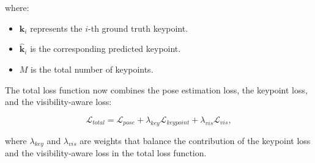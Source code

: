 \noindent where:

\begin{itemize}
    \item $\mathbf{k}_i$ represents the $i$-th ground truth keypoint.
    \item $\hat{\mathbf{k}}_i$ is the corresponding predicted keypoint.
    \item $M$ is the total number of keypoints.
\end{itemize}

\noindent The total loss function now combines the pose estimation loss, the keypoint loss, and the visibility-aware loss:

\begin{equation}
\mathcal{L}_{total} = \mathcal{L}_{pose} + \lambda_{key} \mathcal{L}_{keypoint} + \lambda_{vis} \mathcal{L}_{vis},
\end{equation}

\noindent where $\lambda_{key}$ and $\lambda_{vis}$ are weights that balance the contribution of the keypoint loss and the visibility-aware loss in the total loss function.
